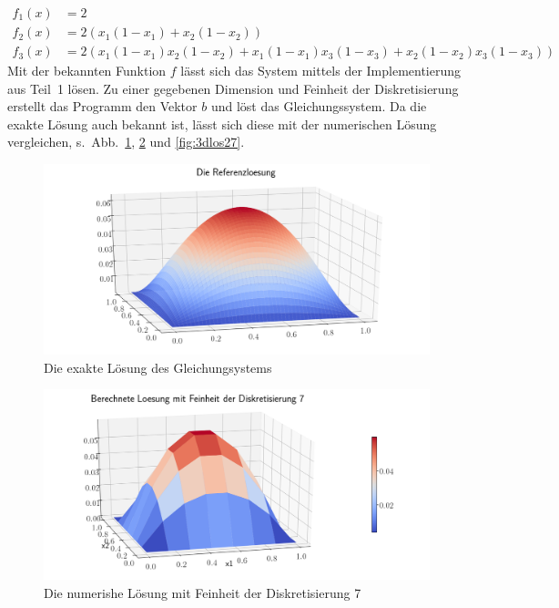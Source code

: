 \documentclass[smallheadings]{scrartcl}
\numberwithin{equation}{section}
\begin{document}
\begin{align}
f_1(x)&=2 \\
f_2(x) &= 2(x_1(1-x_1)+x_2(1-x_2)) \\
f_3(x)&= 2(x_1(1-x_1)x_2(1-x_2)+x_1(1-x_1)x_3(1-x_3)+x_2(1-x_2)x_3(1-x_3))
\end{align}
Mit der bekannten Funktion $f$ lässt sich das System mittels der Implementierung aus Teil~1 lösen. Zu einer gegebenen Dimension und Feinheit der Diskretisierung erstellt das Programm den Vektor $b$ und löst das Gleichungssystem. Da die exakte Lösung auch bekannt ist, lässt sich diese mit der numerischen Lösung vergleichen, s.~Abb.~\ref{fig:referenz}, \ref{fig:3dlos7} und \ref{fig:3dlos27}.

\begin{figure}[H]
	\centering
	\includegraphics[width=\linewidth]{Bericht/Bilder2/referenz}
	\caption{Die exakte Lösung des Gleichungsystems}
	\label{fig:referenz}
\end{figure}

\begin{figure}[H]
	\centering
	\includegraphics[width=\linewidth]{Bericht/Bilder2/3dlos7}
	\caption{Die numerishe Lösung mit Feinheit der Diskretisierung 7}
	\label{fig:3dlos7}
\end{figure}
\end{document}
